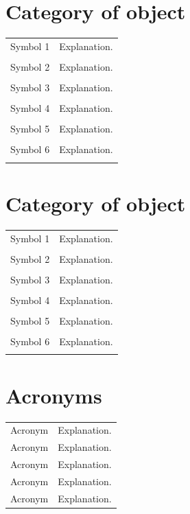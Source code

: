 \section*{Category of object}
\begin{longtable}{>{\raggedright}p{6cm}p{12cm}}
    Symbol 1 & Explanation. \\ \\
    Symbol 2 & Explanation. \\ \\
    Symbol 3 & Explanation. \\ \\
    Symbol 4 & Explanation. \\ \\
    Symbol 5 & Explanation. \\ \\
    Symbol 6 & Explanation. \\ \\
\end{longtable}


\section*{Category of object}
\begin{longtable}{>{\raggedright}p{6cm}p{12cm}}
    Symbol 1 & Explanation. \\ \\
    Symbol 2 & Explanation. \\ \\
    Symbol 3 & Explanation. \\ \\
    Symbol 4 & Explanation. \\ \\
    Symbol 5 & Explanation. \\ \\
    Symbol 6 & Explanation. \\ \\
\end{longtable}


\section*{Acronyms}
\begin{longtable}{>{\raggedright}p{6cm}p{12cm}}
     Acronym & Explanation.\\
     Acronym & Explanation.\\
     Acronym & Explanation.\\
     Acronym & Explanation.\\
     Acronym & Explanation.\\
\end{longtable}

